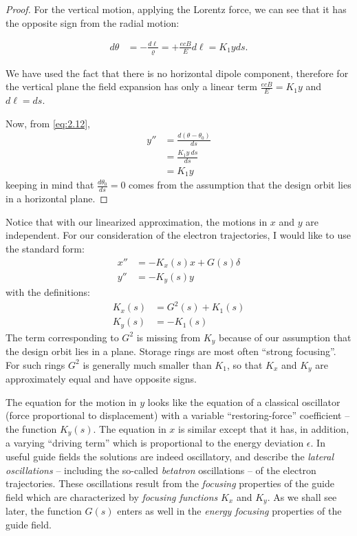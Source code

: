 \begin{proof}
	For the vertical motion, applying the Lorentz force, we can see that it has the opposite sign from the radial motion:

	\begin{align*}
		d\theta &= -\frac{d\ell}{\varrho} = + \frac{ecB}{E}d\ell =  K_1 y ds.
	\end{align*}

 We have used the fact that there is no horizontal dipole component, therefore for the vertical plane the field expansion has only a linear term $\frac{ecB}{E} = K_1 y$ and $d\ell = ds$.

	Now, from \eqref{eq:2.12},
	\begin{align*}
		y'' &= \frac{d(\theta-\theta_0)}{ds}\\
			&= \frac{K_1 y\ ds}{ds}\\
			&= K_1 y
	\end{align*}
	keeping in mind that $\frac{d\theta_0}{ds} = 0$ comes from the assumption that the design orbit lies in a horizontal plane.
\end{proof}

Notice that with our linearized approximation, the motions in $x$ and $y$ are independent. For our consideration of the electron trajectories, I would like to use the standard form:
\begin{align}
	x'' &= -K_x(s)x + G(s)\delta\label{eq:2.19}\\
	y'' &= -K_y(s)y\label{eq:2.20}
\end{align}
with the definitions:
\begin{align}
	K_x(s) &= G^2(s)+K_1(s) \label{eq:2.21}\\
	K_y(s) &= -K_1(s) \label{eq:2.22}
\end{align}
The term corresponding to $G^2$ is missing from $K_y$ because of our assumption that
the design orbit lies in a plane. Storage rings are most often ``strong focusing''. For such rings $G^2$ is generally much smaller than $K_1$, so that $K_x$ and $K_y$ are approximately equal and have opposite signs.

The equation for the motion in $y$ looks like the equation of a classical oscillator (force proportional to displacement) with a variable ``restoring-force'' coefficient -- the function $K_y(s)$. The equation in $x$ is similar except that it has, in addition, a varying ``driving term'' which is proportional to the energy deviation $\epsilon$. In useful guide fields the solutions are indeed oscillatory, and describe the \textit{lateral oscillations} -- including the so-called \textit{betatron} oscillations -- of the electron trajectories. These oscillations result from the \textit{focusing} properties of the guide field which are characterized by \textit{focusing functions} $K_x$ and $K_y$. As we shall see later, the function $G(s)$ enters as well in the \textit{energy focusing} properties of the guide field.

